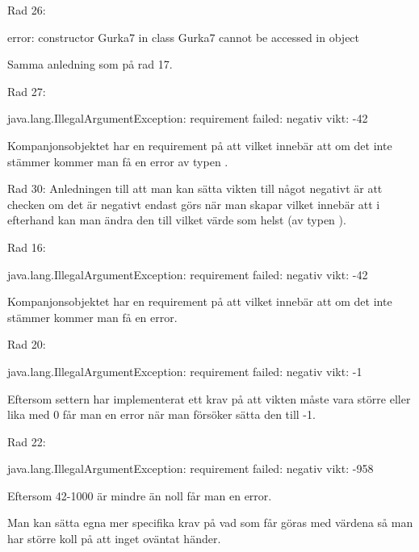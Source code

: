 Rad 26: 
\begin{REPL}
	error: constructor Gurka7 in class Gurka7 cannot be accessed in object
\end{REPL} 
Samma anledning som på rad 17.

Rad 27: 
\begin{REPL}
	java.lang.IllegalArgumentException: requirement failed: negativ vikt: -42
\end{REPL} 
Kompanjonsobjektet har en requirement på att  vilket innebär att om det inte stämmer kommer man få en error av typen .

Rad 30: Anledningen till att man kan sätta vikten till något negativt är att checken om det är negativt endast görs när man skapar  vilket innebär att i efterhand kan man ändra den till vilket värde som helst (av typen ).

\Task %

\Subtask Rad 16: 
\begin{REPL}
	java.lang.IllegalArgumentException: requirement failed: negativ vikt: -42
\end{REPL} 
Kompanjonsobjektet har en requirement på att  vilket innebär att om det inte stämmer kommer man få en error.

Rad 20: 
\begin{REPL}
	java.lang.IllegalArgumentException: requirement failed: negativ vikt: -1
\end{REPL} 
Eftersom settern har implementerat ett krav på att vikten måste vara större eller lika med 0 får man en error när man försöker sätta den till -1.

Rad 22: 
\begin{REPL}
	java.lang.IllegalArgumentException: requirement failed: negativ vikt: -958
\end{REPL} 
Eftersom 42-1000 är mindre än noll får man en error.

\Subtask Man kan sätta egna mer specifika krav på vad som får göras med värdena så man har större koll på att inget oväntat händer.

\Task {}

